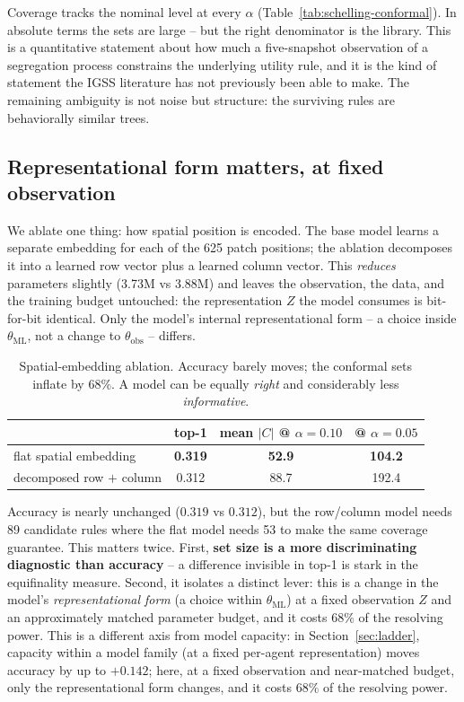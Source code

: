 \documentclass[11pt]{article}
\begin{document}
Coverage tracks the nominal level at every $\alpha$ (Table~\ref{tab:schelling-conformal}).
In absolute terms the sets are large -- but the right denominator is the library. This
is a quantitative statement about how much a five-snapshot observation of a
segregation process constrains the underlying utility rule, and it is the kind of
statement the IGSS literature has not previously been able to make. The remaining
ambiguity is not noise but structure: the surviving rules are behaviorally similar
trees.

\subsection{Representational form matters, at fixed observation}
\label{sec:rowcol}

We ablate one thing: how spatial position is encoded. The base model learns a
separate embedding for each of the 625 patch positions; the ablation decomposes it
into a learned row vector plus a learned column vector. This \emph{reduces} parameters
slightly (3.73M vs 3.88M) and leaves the observation, the data, and the training
budget untouched: the representation $Z$ the model consumes is bit-for-bit identical.
Only the model's internal representational form -- a choice inside
$\theta_{\mathrm{ML}}$, not a change to $\theta_{\mathrm{obs}}$ -- differs.

\begin{table}[t]
\centering
\small
\caption{Spatial-embedding ablation. Accuracy barely moves; the conformal sets
inflate by $68\%$. A model can be equally \emph{right} and considerably less
\emph{informative}.}
\label{tab:rowcol}
\begin{tabular}{lccc}
\toprule
 & top-1 & mean $|C|$ @ $\alpha{=}0.10$ & @ $\alpha{=}0.05$ \\
\midrule
flat spatial embedding      & \textbf{0.319} & \textbf{52.9} & \textbf{104.2} \\
decomposed row $+$ column   & 0.312 & 88.7 & 192.4 \\
\bottomrule
\end{tabular}
\end{table}

Accuracy is nearly unchanged ($0.319$ vs $0.312$), but the row/column model needs 89
candidate rules where the flat model needs 53 to make the same coverage guarantee.
This matters twice. First, \textbf{set size is a more discriminating diagnostic than
accuracy} -- a difference invisible in top-1 is stark in the equifinality measure.
Second, it isolates a distinct lever: this is a change in the model's
\emph{representational form} (a choice within $\theta_{\mathrm{ML}}$) at a fixed
observation $Z$ and an approximately matched parameter budget, and it costs $68\%$ of
the resolving power. This is a different axis from model capacity: in
Section~\ref{sec:ladder}, capacity within a model family (at a fixed per-agent
representation) moves accuracy by up to $+0.142$; here, at a fixed observation and
near-matched budget, only the representational form changes, and it costs $68\%$ of the
resolving power.
\end{document}
